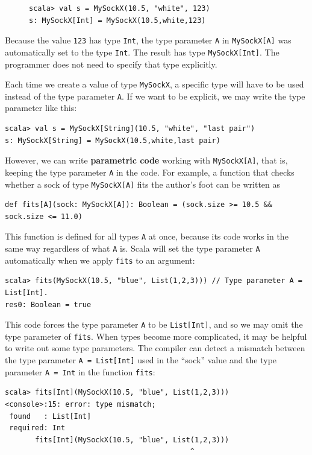 \begin{figure}%
\vspace{-0.75\baselineskip}
\begin{lstlisting}
scala> val s = MySockX(10.5, "white", 123)
s: MySockX[Int] = MySockX(10.5,white,123) 
\end{lstlisting}

\vspace{-1\baselineskip}
\end{figure}%

\noindent Because the value \lstinline!123! has type \lstinline!Int!,
the type parameter \lstinline!A! in \lstinline!MySockX[A]! was automatically
set to the type \lstinline!Int!. The result has type \lstinline!MySockX[Int]!.
The programmer does not need to specify that type explicitly.

Each time we create a value of type \lstinline!MySockX!, a specific
type will have to be used instead of the type parameter \lstinline!A!.
If we want to be explicit, we may write the type parameter like this:
\begin{lstlisting}
scala> val s = MySockX[String](10.5, "white", "last pair")
s: MySockX[String] = MySockX(10.5,white,last pair) 
\end{lstlisting}
However, we can write \textbf{parametric code}
working with \lstinline!MySockX[A]!, that is, keeping the type parameter
\lstinline!A! in the code. For example, a function that checks whether
a sock of type \lstinline!MySockX[A]! fits the author's foot can
be written as
\begin{lstlisting}
def fits[A](sock: MySockX[A]): Boolean = (sock.size >= 10.5 && sock.size <= 11.0)
\end{lstlisting}
This function is defined for all types \lstinline!A! at once, because
its code works in the same way regardless of what \lstinline!A! is.
Scala will set the type parameter \lstinline!A! automatically when
we apply \lstinline!fits! to an argument:
\begin{lstlisting}
scala> fits(MySockX(10.5, "blue", List(1,2,3))) // Type parameter A = List[Int].
res0: Boolean = true
\end{lstlisting}
This code forces the type parameter \lstinline!A! to be \lstinline!List[Int]!,
and so we may omit the type parameter of \lstinline!fits!. When types
become more complicated, it may be helpful to write out some type
parameters. The compiler can detect a mismatch between the type parameter
\lstinline!A = List[Int]! used in the ``sock'' value and the type
parameter \lstinline!A = Int! in the function \lstinline!fits!:
\begin{lstlisting}
scala> fits[Int](MySockX(10.5, "blue", List(1,2,3)))
<console>:15: error: type mismatch;
 found   : List[Int]
 required: Int
       fits[Int](MySockX(10.5, "blue", List(1,2,3)))
                                           ^ 
\end{lstlisting}

